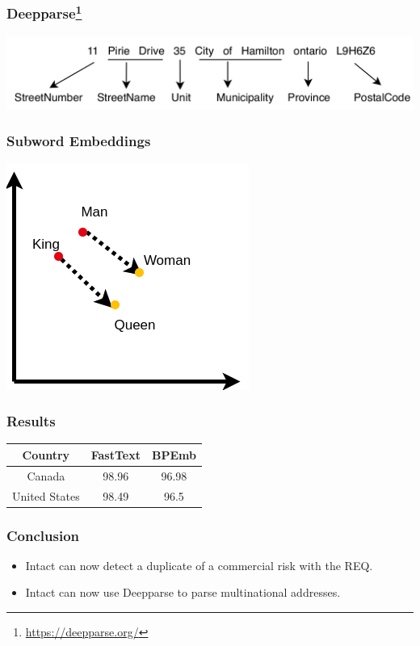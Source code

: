 \documentclass[aspectratio=169,10pt,xcolor=x11names,english,french]{beamer}
\begin{document}
	\begin{frame}\frametitle{Deepparse\footnote{\url{https://deepparse.org/}}}
		\centering
		\includegraphics[scale=0.3, keepaspectratio]{address_parsing.png}
	\end{frame}

	\begin{frame}\frametitle{Subword Embeddings}
				\centering
		\includegraphics[scale=0.6, keepaspectratio]{vectors.png}
	\end{frame}

	\begin{frame}\frametitle{Results}
		\centering
		\begin{tabular}{ccc}
			\toprule
			Country& FastText & BPEmb\\ \midrule
			Canada & 98.96 & 96.98\\
			United States & 98.49 & 96.5\\
			\bottomrule
		\end{tabular}
	\end{frame}

	\begin{frame}\frametitle{Conclusion}
		\begin{itemize}
			\item Intact can now detect a duplicate of a commercial risk with the REQ.
			\item Intact can now use Deepparse to parse multinational addresses.
		\end{itemize}
	\end{frame}
\end{document}
